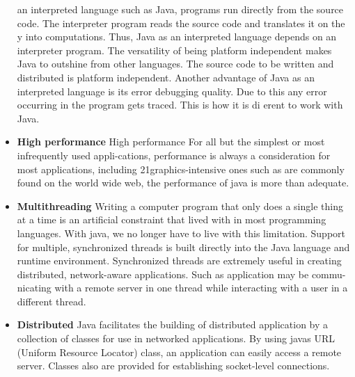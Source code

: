 \begin{itemize}
an interpreted language such as Java, programs run directly from the
source code.
The interpreter program reads the source code and translates it on the y
into computations. Thus, Java as an interpreted language depends on an
interpreter program.
The versatility of being platform independent makes Java to outshine from
other languages. The source code to be written and distributed is platform
independent.
Another advantage of Java as an interpreted language is its error
debugging quality. Due to this any error occurring in the program gets
traced. This is how it is di erent to work with Java.
\item \textbf{High performance}
High performance For all but the simplest or most infrequently used appli-cations,
performance is always a consideration for most applications, including
21graphics-intensive ones such as are commonly found on the world wide web,
the performance of java is more than adequate.
\item \textbf{Multithreading}
Writing a computer program that only does a single thing at a
time is an artificial constraint that lived with in most programming
languages. With java, we no longer have to live with this limitation. Support
for multiple, synchronized threads is built directly into the Java language
and runtime environment. Synchronized threads are extremely useful in
creating distributed, network-aware applications. Such as application may
be commu-nicating with a remote server in one thread while interacting
with a user in a different thread.
\item \textbf{Distributed}
Java facilitates the building of distributed application by a collection
of classes for use in networked applications. By using javas URL (Uniform
Resource Locator) class, an application can easily access a remote server.
Classes also are provided for establishing socket-level connections.


\end{itemize}



